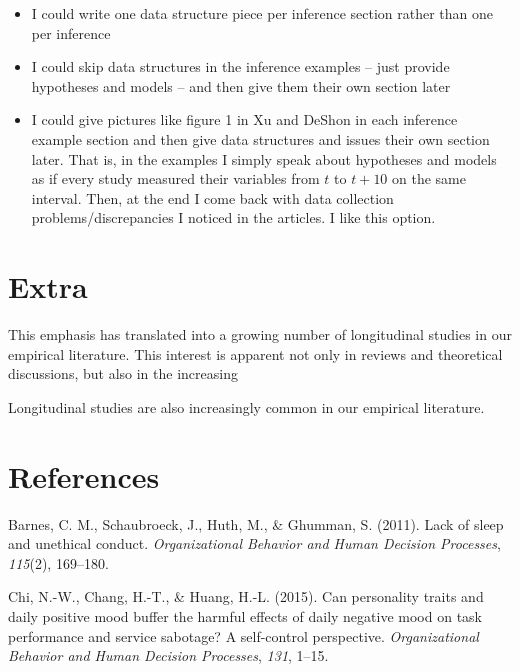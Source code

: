 \documentclass[english,,man]{apa6}
\theoremstyle{definition}
\theoremstyle{definition}
\theoremstyle{definition}
\theoremstyle{remark}
\begin{document}
\begin{enumerate}
\begin{itemize}
    \begin{itemize}
    \item
      I could write one data structure piece per inference section
      rather than one per inference
    \item
      I could skip data structures in the inference examples -- just
      provide hypotheses and models -- and then give them their own
      section later
    \item
      I could give pictures like figure 1 in Xu and DeShon in each
      inference example section and then give data structures and issues
      their own section later. That is, in the examples I simply speak
      about hypotheses and models as if every study measured their
      variables from \(t\) to \(t + 10\) on the same interval. Then, at
      the end I come back with data collection problems/discrepancies I
      noticed in the articles. I like this option.
    \end{itemize}
  \end{itemize}
\end{enumerate}

\hypertarget{extra}{%
\section{Extra}\label{extra}}

This emphasis has translated into a growing number of longitudinal
studies in our empirical literature. This interest is apparent not only
in reviews and theoretical discussions, but also in the increasing

Longitudinal studies are also increasingly common in our empirical
literature.

\newpage

\hypertarget{references}{%
\section{References}\label{references}}

\setlength{\parindent}{-0.5in}
\setlength{\leftskip}{0.5in}

\hypertarget{refs}{}
\leavevmode\hypertarget{ref-barnes2011}{}%
Barnes, C. M., Schaubroeck, J., Huth, M., \& Ghumman, S. (2011). Lack of
sleep and unethical conduct. \emph{Organizational Behavior and Human
Decision Processes}, \emph{115}(2), 169--180.

\leavevmode\hypertarget{ref-chi2015}{}%
Chi, N.-W., Chang, H.-T., \& Huang, H.-L. (2015). Can personality traits
and daily positive mood buffer the harmful effects of daily negative
mood on task performance and service sabotage? A self-control
perspective. \emph{Organizational Behavior and Human Decision
Processes}, \emph{131}, 1--15.
\end{document}
